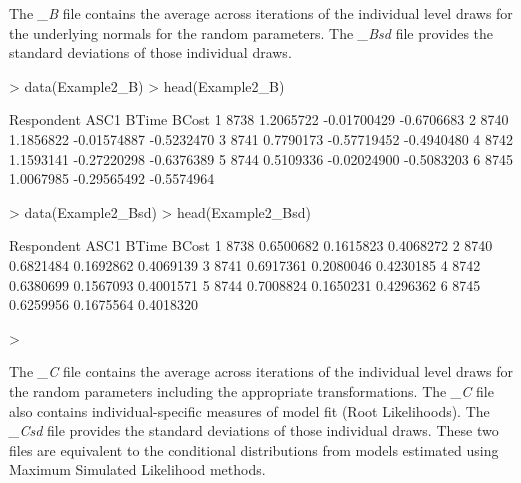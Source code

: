 \documentclass{article}
\begin{document}
The \emph{\_B} file contains the average across iterations of the individual level draws for the underlying normals for the random parameters. The \emph{\_Bsd} file provides the standard deviations of those individual draws.

\begin{Schunk}
\begin{Sinput}
> data(Example2_B)
> head(Example2_B)
\end{Sinput}
\begin{Soutput}
  Respondent      ASC1       BTime      BCost
1       8738 1.2065722 -0.01700429 -0.6706683
2       8740 1.1856822 -0.01574887 -0.5232470
3       8741 0.7790173 -0.57719452 -0.4940480
4       8742 1.1593141 -0.27220298 -0.6376389
5       8744 0.5109336 -0.02024900 -0.5083203
6       8745 1.0067985 -0.29565492 -0.5574964
\end{Soutput}
\begin{Sinput}
> data(Example2_Bsd)
> head(Example2_Bsd)
\end{Sinput}
\begin{Soutput}
  Respondent      ASC1     BTime     BCost
1       8738 0.6500682 0.1615823 0.4068272
2       8740 0.6821484 0.1692862 0.4069139
3       8741 0.6917361 0.2080046 0.4230185
4       8742 0.6380699 0.1567093 0.4001571
5       8744 0.7008824 0.1650231 0.4296362
6       8745 0.6259956 0.1675564 0.4018320
\end{Soutput}
\begin{Sinput}
> 
\end{Sinput}
\end{Schunk}

The \emph{\_C} file contains the average across iterations of the individual level draws for the random parameters including the appropriate transformations. The \emph{\_C} file also contains individual-specific measures of model fit (Root Likelihoods). The \emph{\_Csd} file provides the standard deviations of those individual draws. These two files are equivalent to the conditional distributions from models estimated using Maximum Simulated Likelihood methods.
\end{document}
